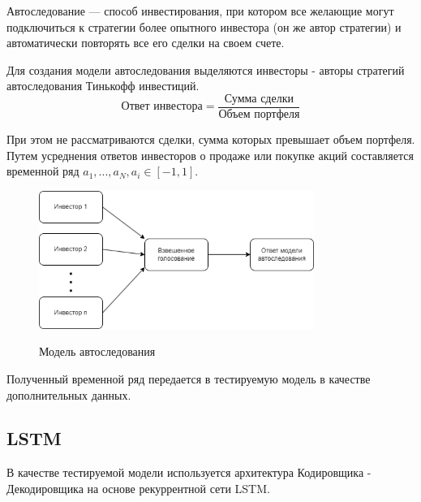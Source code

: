 Автоследование --- способ инвестирования, при котором все желающие могут подключиться к стратегии более опытного инвестора (он же автор стратегии) и автоматически повторять все его сделки на своем счете. 

Для создания модели автоследования выделяются инвесторы - авторы стратегий автоследования Тинькофф инвестиций. 
\[\text{Ответ инвестора} = \frac{\text{Сумма сделки}}{\text{Объем портфеля}}\]

При этом не рассматриваются сделки, сумма которых превышает объем портфеля.
 Путем усреднения ответов инвесторов о продаже или покупке акций составляется временной ряд $a_{1}, ..., a_{N}, a_{i} \in [-1, 1]$. 

\begin{figure}[H]\center
{\includegraphics[width=0.8\textwidth]{results/voting.png}}
\caption{Модель автоследования}
\end{figure}

Полученный временной ряд передается в тестируемую модель в качестве дополнительных данных.

\newpage
\subsection{LSTM}

В качестве тестируемой модели используется архитектура Кодировщика - Декодировщика на основе рекуррентной сети LSTM.

